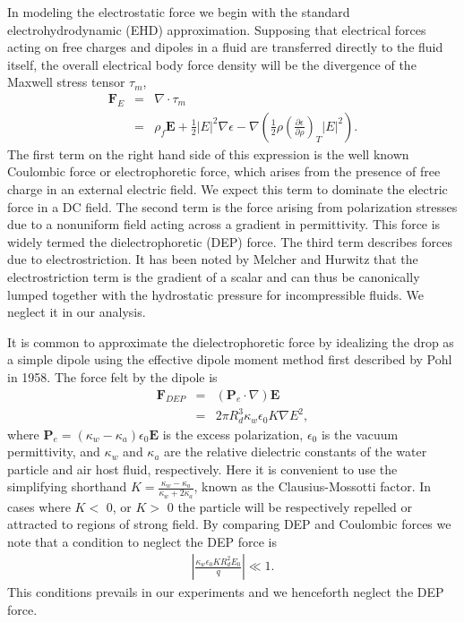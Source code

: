 \documentclass[aip,reprint, floatfix]{revtex4-1}
\begin{document}
In modeling the electrostatic force we begin with the standard electrohydrodynamic (EHD) approximation. \cite{saville_electrohydrodynamics_1997} Supposing that electrical forces acting on free charges and dipoles in a fluid are transferred directly to the fluid itself, the overall electrical body force density will be the divergence of the Maxwell stress tensor $\tau_m $,
\begin{eqnarray} \label{e_force}
 \mathbf{F}_E &=& \nabla \cdot \tau_m \nonumber \\ 
 &=& \rho_f \mathbf{E} + \frac{1}{2} \left| E \right|^2 \nabla \epsilon - \nabla \left( \frac{1}{2} \rho \left( \frac{\partial \epsilon}{\partial \rho} \right)_T \left| E \right|^2 \right) .
\end{eqnarray}
The first term on the right hand side of this expression is the well known Coulombic force or electrophoretic force, which arises from the presence of free charge in an external electric field. We expect this term to dominate the electric force in a DC field. The second term is the force arising from polarization stresses due to a nonuniform field acting across a gradient in permittivity. This force is widely termed the dielectrophoretic (DEP) force. The third term describes forces due to electrostriction. It has been noted by Melcher and Hurwitz \cite{hurwitz_electrohydrodynamic_1966} that the electrostriction term is the gradient of a scalar and can thus be canonically lumped together with the hydrostatic pressure for incompressible fluids. We neglect it in our analysis. 

It is common to approximate the dielectrophoretic force by idealizing the drop as a simple dipole using the effective dipole moment method first described by Pohl in 1958. \cite{pohl_effects_1958} The force felt by the dipole is 
\begin{eqnarray}
\mathbf{F}_{DEP} &=& \left( \mathbf{P}_e \cdot \nabla \right) \mathbf{E} \nonumber \\
&=& 2 \pi R_d^3 \kappa_w \epsilon_0 K \nabla E^2, \nonumber
\end{eqnarray}
where $\mathbf{P}_e=(\kappa_w - \kappa_a)\epsilon_0 \mathbf{E}$ is the excess polarization, $\epsilon_0$ is the vacuum permittivity, and $\kappa_w$ and $\kappa_a$ are the relative dielectric constants of the water particle and air host fluid, respectively. Here it is convenient to use the simplifying shorthand $K = \frac{\kappa_w - \kappa_a}{\kappa_w + 2 \kappa_a}$, known as the Clausius-Mossotti factor. In cases where $K <$ 0, or $K>$ 0 the particle will be respectively repelled or attracted to regions of strong field. By comparing DEP and Coulombic forces we note that a condition to neglect the DEP force is
\begin{eqnarray}
\left| \frac{ \kappa_w \epsilon_0 K R_d^2 E_0}{q} \right| \ll 1. \nonumber
\end{eqnarray}
This conditions prevails in our experiments and we henceforth neglect the DEP force. 
\end{document}
